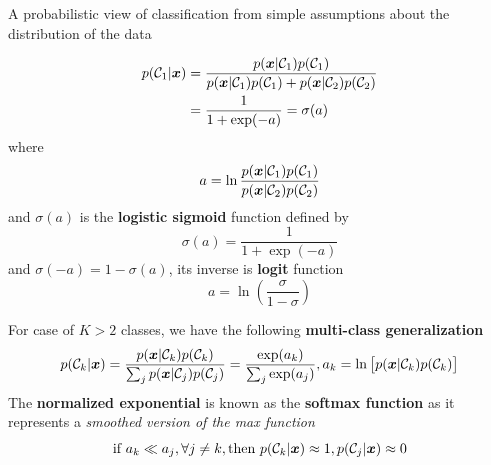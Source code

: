 \documentclass[11pt]{article}
\begin{document}
A probabilistic view of classification from simple assumptions about the
distribution of the data

\begin{align*}
p(\mathcal{C}_1|\boldsymbol{x})&=\frac{p(\boldsymbol{x}|\mathcal{C}_1)p(\mathcal{C}_1)}
{p(\boldsymbol{x}|\mathcal{C}_1)p(\mathcal{C}_1)+p(\boldsymbol{x}|\mathcal{C}_2)p(\mathcal{C}_2)}\\
&=\frac{1}{1+\exp(-a)}=\sigma(a)
\end{align*}
where 
\begin{equation*}
a=\ln\frac{p(\boldsymbol{x}|\mathcal{C}_1)p(\mathcal{C}_1)}
{p(\boldsymbol{x}|\mathcal{C}_2)p(\mathcal{C}_2)}
\end{equation*}
and \(\sigma(a)\) is the \textbf{logistic sigmoid} function defined by
\begin{equation*}
\sigma(a)=\frac{1}{1+\exp(-a)}
\end{equation*}
and \(\sigma(-a)=1-\sigma(a)\), its inverse is \textbf{logit} function
\begin{equation*}
a=\ln(\frac{\sigma}{1-\sigma})
\end{equation*}

For case of \(K > 2\) classes, we have the following \textbf{multi-class generalization}
\begin{equation*}
p(\mathcal{C}_k|\boldsymbol{x})=\frac{p(\boldsymbol{x}|\mathcal{C}_k)p(\mathcal{C}_k)}
{\sum_jp(\boldsymbol{x}|\mathcal{C}_j)p(\mathcal{C}_j)}=\frac{\exp(a_k)}{\sum_j\exp(a_j)},
a_k=\ln\left[p(\boldsymbol{x}|\mathcal{C}_k)p(\mathcal{C}_k)\right]
\end{equation*}
The \textbf{normalized exponential} is known as the \textbf{softmax function} as it represents
a \emph{smoothed version of the max function}
\begin{equation*}
\text{if } a_k\ll a_j,\forall j\neq k,\text{then } p(\mathcal{C}_k|\boldsymbol{x})\approx 1,
p(\mathcal{C}_j|\boldsymbol{x})\approx 0
\end{equation*}
\end{document}
